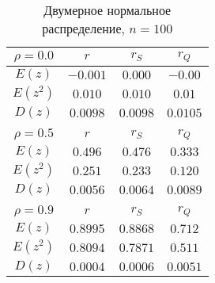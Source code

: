 \documentclass[12pt,a4paper]{article}
\begin{document}
\begin{center}
		\newpage
		\begin{table}[h!]
			\begin{center}
				\begin{tabular}{|c|c|c|c|}
					\hline
					$\rho=0.0$ & $r$ & $r_S$ & $r_Q$\\
					\hline
					$E(z)$ & $-0.001$ & $0.000$ & $-0.00$ \\
					\hline
					$E(z^2)$ & $0.010$ & $0.010$ & $0.01$ \\
					\hline
					$D(z)$ & $0.0098$ & $0.0098$ & $0.0105$ \\
					\hline
					\multicolumn{4}{c}{ } \\
					\hline
					$\rho=0.5$ & $r$ & $r_S$ & $r_Q$\\
					\hline
					$E(z)$ & $0.496$ & $0.476$ & $0.333$ \\
					\hline
					$E(z^2)$ & $0.251$ & $0.233$ & $0.120$ \\
					\hline
					$D(z)$ & $0.0056$ & $0.0064$ & $0.0089$ \\
					\hline
					\multicolumn{4}{c}{ } \\
					\hline
					$\rho=0.9$ & $r$ & $r_S$ & $r_Q$\\
					\hline
					$E(z)$ & $0.8995$ & $0.8868$ & $0.712$ \\
					\hline
					$E(z^2)$ & $0.8094$ & $0.7871$ & $0.511$ \\
					\hline
					$D(z)$ & $0.0004$ & $0.0006$ & $0.0051$ \\
					\hline					
				\end{tabular}
				\caption{Двумерное нормальное распределение, $n = 100$}
			\end{center}
		\end{table}
		

\end{center}
\end{document}
